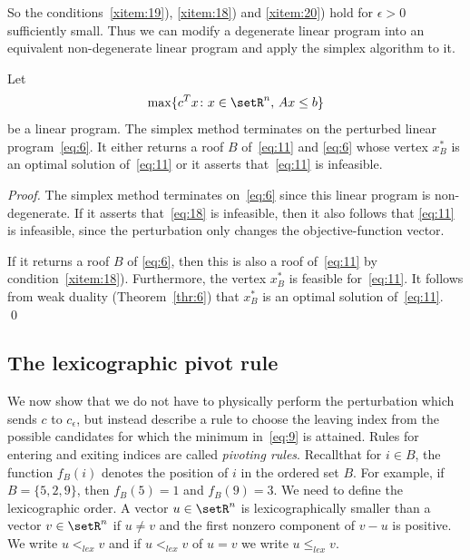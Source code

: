  So the conditions~\ref{xitem:19}), \ref{xitem:18}) and
 \ref{xitem:20}) hold for $\epsilon>0$ sufficiently small. Thus we can
 modify a degenerate linear program into an equivalent non-degenerate
 linear program and apply the simplex algorithm to it.


 \begin{theorem}
   \label{thr:2}
   Let 
   \begin{equation}
     \label{eq:11}
        \max\{c^Tx \colon x \in \setR^n, \, Ax\leq b\}
   \end{equation}
   be a linear program. The simplex method
   terminates on the perturbed linear program~\eqref{eq:6}. It either
   returns  a roof
   $B$ of~\eqref{eq:11} and \eqref{eq:6} whose vertex $x^*_{B}$ is
   an optimal solution of~\eqref{eq:11} or it asserts
   that~\eqref{eq:11} is infeasible. 
 \end{theorem}
 

 \begin{proof}
   The simplex method terminates on~\eqref{eq:6} since this linear
   program is non-degenerate. If it asserts that~\eqref{eq:18} is
   infeasible, then it also follows that \eqref{eq:11} is infeasible,
   since the perturbation only changes the objective-function vector.
   
   If it returns a roof $B$ of \eqref{eq:6}, then this is also a roof
   of~\eqref{eq:11} by condition~\ref{xitem:18}). Furthermore, the
   vertex $x^*_{B}$ is feasible for~\eqref{eq:11}. It follows from
   weak  duality   (Theorem~\ref{thr:6}) that $x^*_{B}$ is an optimal
   solution of~\eqref{eq:11}.  \qed 
 \end{proof}





   \subsection{The lexicographic pivot rule}
   \label{sec:lexic-pivot-rule}


   We now show that we do not have to physically perform the
   perturbation which sends $c$ to $c_\epsilon$, but instead describe a rule to
   choose the leaving index from the possible candidates for which the
   minimum in~\eqref{eq:9} is attained. Rules for entering and exiting
   indices are called \emph{pivoting rules}.  Recallthat for  $i \in
   B$, the function $f_B(i)$ 
   denotes the position of $i$ in the ordered set $B$. For example, if
   $B = \{5,2,9\}$, then $f_B(5)=1$ and $f_B(9)=3$. We need to define
   the lexicographic order. A vector $u \in \setR^n$ is lexicographically
   smaller than a vector $v \in \setR^n$ if $u\neq v$ and the first nonzero
   component of $v-u$ is positive.  We write $u<_{lex}v$ and if
   $u<_{lex}v$ of $u=v$ we write $u\leq_{lex}v$. 
   

